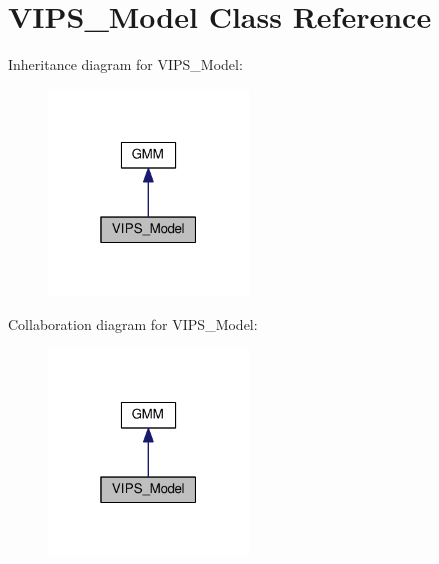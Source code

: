 \hypertarget{classVIPS__Model}{}\section{V\+I\+P\+S\+\_\+\+Model Class Reference}
\label{classVIPS__Model}


Inheritance diagram for V\+I\+P\+S\+\_\+\+Model\+:\nopagebreak
\begin{figure}[H]
\begin{center}
\leavevmode
\includegraphics[width=151pt]{classVIPS__Model__inherit__graph}
\end{center}
\end{figure}


Collaboration diagram for V\+I\+P\+S\+\_\+\+Model\+:\nopagebreak
\begin{figure}[H]
\begin{center}
\leavevmode
\includegraphics[width=151pt]{classVIPS__Model__coll__graph}
\end{center}
\end{figure}
